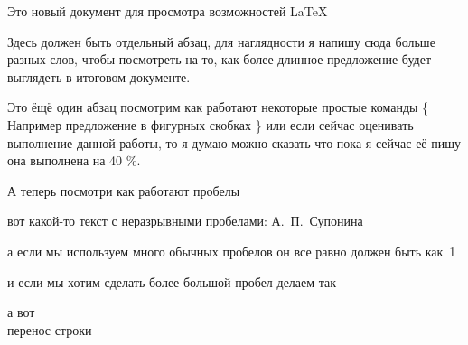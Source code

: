 \documentclass[a4paper,12pt]{article}
\begin{document}
	Это новый документ для просмотра возможностей LaTeX
	
	Здесь должен быть отдельный абзац, для наглядности я напишу сюда больше разных слов, чтобы посмотреть на то, как более длинное предложение будет выглядеть в итоговом документе.
	
	Это ёщё один абзац посмотрим как работают некоторые простые команды \{ Например предложение в фигурных скобках \} или если сейчас оценивать выполнение данной работы, то я думаю можно сказать что пока я сейчас её пишу она выполнена на 40 \%.

	А теперь посмотри как работают пробелы

	вот какой-то текст с неразрывными пробелами: А.~П.~Супонина

а если мы используем много обычных пробелов             он все равно должен быть как~1

и если мы хотим сделать более большой пробел \;\;\; делаем так 

а вот \\ перенос строки
 
\end{document}
